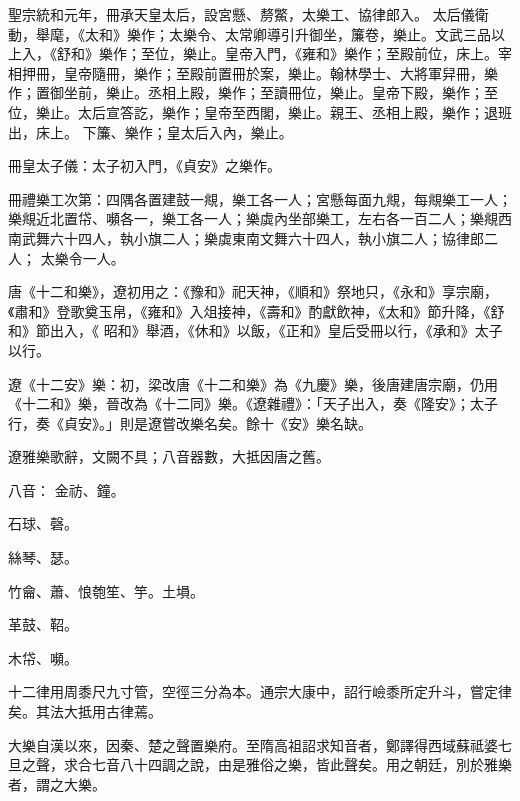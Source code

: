 \begin{pinyinscope}
 聖宗統和元年，冊承天皇太后，設宮懸、剺鱉，太樂工、協律郎入。
 太后儀衛動，舉麾，《太和》樂作；太樂令、太常卿導引升御坐，簾卷，樂止。文武三品以上入，《舒和》樂作；至位，樂止。皇帝入門，《雍和》樂作；至殿前位，床上。宰相押冊，皇帝隨冊，樂作；至殿前置冊於案，樂止。翰林學士、大將軍舁冊，樂作；置御坐前，樂止。丞相上殿，樂作；至讀冊位，樂止。皇帝下殿，樂作；至位，樂止。太后宣答訖，樂作；皇帝至西閣，樂止。親王、丞相上殿，樂作；退班出，床上。
 下簾、樂作；皇太后入內，樂止。



 冊皇太子儀：太子初入門，《貞安》之樂作。



 冊禮樂工次第：四隅各置建鼓一覜，樂工各一人；宮懸每面九覜，每覜樂工一人；樂覜近北置帒、嚬各一，樂工各一人；樂虡內坐部樂工，左右各一百二人；樂覜西南武舞六十四人，執小旗二人；樂虡東南文舞六十四人，執小旗二人；協律郎二人；
 太樂令一人。



 唐《十二和樂》，遼初用之：《豫和》祀天神，《順和》祭地只，《永和》享宗廟，《肅和》登歌奠玉帛，《雍和》入俎接神，《壽和》酌獻飲神，《太和》節升降，《舒和》節出入，《
 昭和》舉酒，《休和》以飯，《正和》皇后受冊以行，《承和》太子以行。



 遼《十二安》樂：初，梁改唐《十二和樂》為《九慶》樂，後唐建唐宗廟，仍用《十二和》樂，晉改為《十二同》樂。《遼雜禮》：「天子出入，奏《隆安》；太子行，奏《貞安》。」則是遼嘗改樂名矣。餘十《安》樂名缺。



 遼雅樂歌辭，文闕不具；八音器數，大抵因唐之舊。



 八音：
 金祊、鐘。



 石球、磬。



 絲琴、瑟。



 竹龠、蕭、悢匏笙、竽。土塤。



 革鼓、鞀。



 木帒、嚬。



 十二律用周黍尺九寸管，空徑三分為本。通宗大康中，詔行嶮黍所定升斗，嘗定律矣。其法大抵用古律蔫。



 大樂自漢以來，因秦、楚之聲置樂府。至隋高祖詔求知音者，鄭譯得西域蘇祗婆七旦之聲，求合七音八十四調之說，由是雅俗之樂，皆此聲矣。用之朝廷，別於雅樂者，謂之大樂。




\end{pinyinscope}
